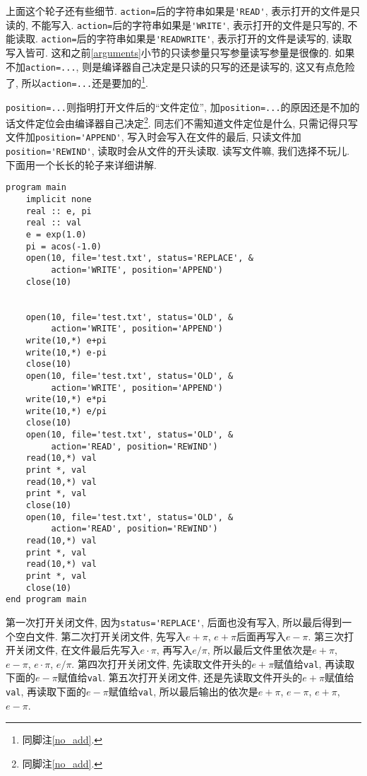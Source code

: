 上面这个轮子还有些细节. \verb|action=|后的字符串如果是\verb|'READ'|, 表示打开的文件是只读的, 不能写入. \verb|action=|后的字符串如果是\verb|'WRITE'|, 表示打开的文件是只写的, 不能读取. \verb|action=|后的字符串如果是\verb|'READWRITE'|, 表示打开的文件是读写的, 读取写入皆可. 这和之前\ref{arguments}小节的只读参量只写参量读写参量是很像的. 如果不加\verb|action=...|, 则是编译器自己决定是只读的只写的还是读写的, 这又有点危险了, 所以\verb|action=...|还是要加的\footnote{同脚注\ref{no_add}.}.

\verb|position=...|则指明打开文件后的``文件定位'', 加\verb|position=...|的原因还是不加的话文件定位会由编译器自己决定\footnote{同脚注\ref{no_add}.}. 同志们不需知道文件定位是什么, 只需记得只写文件加\verb|position='APPEND'|, 写入时会写入在文件的最后, 只读文件加\verb|position='REWIND'|, 读取时会从文件的开头读取. 读写文件嘛, 我们选择不玩儿. 下面用一个长长的轮子来详细讲解.
\begin{verbatim}
program main
    implicit none
    real :: e, pi
    real :: val
    e = exp(1.0)
    pi = acos(-1.0)
    open(10, file='test.txt', status='REPLACE', &
         action='WRITE', position='APPEND')
    close(10)


    open(10, file='test.txt', status='OLD', &
         action='WRITE', position='APPEND')
    write(10,*) e+pi
    write(10,*) e-pi
    close(10)
    open(10, file='test.txt', status='OLD', &
         action='WRITE', position='APPEND')
    write(10,*) e*pi
    write(10,*) e/pi
    close(10)
    open(10, file='test.txt', status='OLD', &
         action='READ', position='REWIND')
    read(10,*) val
    print *, val
    read(10,*) val
    print *, val
    close(10)
    open(10, file='test.txt', status='OLD', &
         action='READ', position='REWIND')
    read(10,*) val
    print *, val
    read(10,*) val
    print *, val
    close(10)
end program main
\end{verbatim}
第一次打开关闭文件, 因为\verb|status='REPLACE'|, 后面也没有写入, 所以最后得到一个空白文件. 第二次打开关闭文件, 先写入$e+\pi$, $e+\pi$后面再写入$e-\pi$. 第三次打开关闭文件, 在文件最后先写入$e\cdot\pi$, 再写入$e/\pi$, 所以最后文件里依次是$e+\pi$, $e-\pi$, $e\cdot\pi$, $e/\pi$. 第四次打开关闭文件, 先读取文件开头的$e+\pi$赋值给\verb|val|, 再读取下面的$e-\pi$赋值给\verb|val|. 第五次打开关闭文件, 还是先读取文件开头的$e+\pi$赋值给\verb|val|, 再读取下面的$e-\pi$赋值给\verb|val|, 所以最后输出的依次是$e+\pi$, $e-\pi$, $e+\pi$, $e-\pi$.

